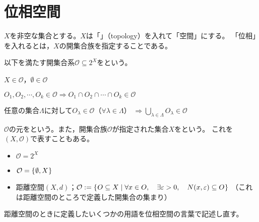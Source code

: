 \documentclass[uplatex]{jsarticle}
\renewcommand{\thepart}{\arabic{part}}
\begin{document}
  \fi
\renewcommand{\thesubsection}{\thepart.\arabic{section}.\arabic{subsection}}
  
\section{位相空間}

$X$を非空な集合とする。$X$は「」（topology）を入れて「空間」にする。
「位相」を入れるとは，$X$の開集合族を指定することである。

\begin{teigi}[位相]
  以下を満たす開集合系$\mathcal{O} \subseteq 2^{X}$をという。

   $X \in \mathcal{O}$，$\emptyset \in \mathcal{O}$

   $O_{1}, O_{2}, \cdots, O_{k} \in \mathcal{O} \Longrightarrow O_{1} \cap O_{2} \cap \cdots \cap O_{k} \in \mathcal{O}$

   任意の集合$\Lambda$に対して$O_{\lambda} \in \mathcal{O}$（$\forall \lambda \in \Lambda$） ${\displaystyle \Longrightarrow \bigcup_{\lambda \in \Lambda} O_{\lambda} \in \mathcal{O}}$

  $\mathcal{O}$の元をという。また，開集合族$\mathcal{O}$が指定された集合$X$をという。
  これを$(X,\mathcal{O})$で表すこともある。
\end{teigi}

\begin{rei}
  \begin{itemize}
    \item {} $\mathcal{O} = 2^{X}$
    \item {} $\mathcal{O} = \Set{\hspace{-1.8pt} \emptyset, X \hspace{-1.8pt}}$
    \item 距離空間$(X,d)$；$\mathcal{O} := \Set{\hspace{-1.8pt} O \subseteq X | \forall x \in O, \quad \exists \varepsilon > 0, \quad N(x, \varepsilon) \subseteq O \hspace{-1.8pt}}$
    （これは距離空間のところで定義した開集合の集まり）
  \end{itemize}
\end{rei}

距離空間のときに定義したいくつかの用語を位相空間の言葉で記述し直す。
\end{document}
